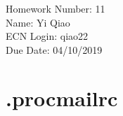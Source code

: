 \documentclass[11pt]{article}
\begin{document}
\noindent Homework Number: 11\\
Name: Yi Qiao\\
ECN Login: qiao22\\
Due Date: 04/10/2019\\

\section*{.procmailrc}
\inputminted[breaklines]{bash}{dot_procmailrc}
\end{document}
